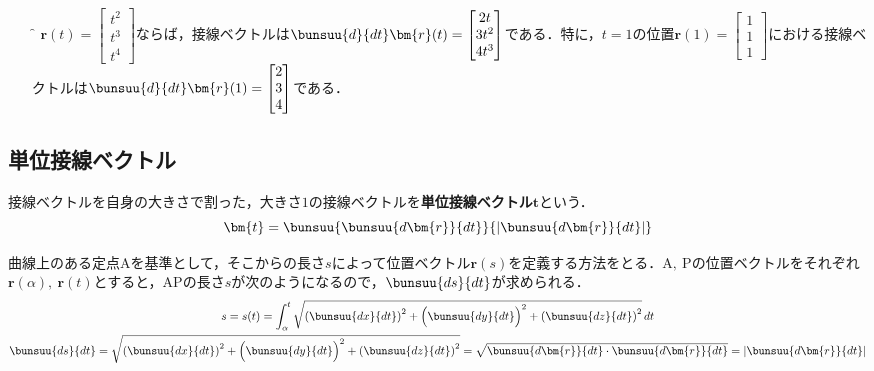 \begin{enumerate}[leftmargin=18pt, labelsep=10pt, labelsep=10pt, itemindent=9pt]
	\item[\f{例}] $\bm{r}(t) =
		\begin{bmatrix}
			t^2\\ t^3\\ t^4
		\end{bmatrix}
		$ならば，接線ベクトルは$\bunsuu{d}{dt}\bm{r}(t) =
		\begin{bmatrix}
			2t\\ 3t^2\\ 4t^3
		\end{bmatrix}
		$である．特に，$t = 1$の位置$\bm{r}(1) =
		\begin{bmatrix}
			1\\ 1\\ 1
		\end{bmatrix}
		$における接線ベクトルは$\bunsuu{d}{dt}\bm{r}(1) =
		\begin{bmatrix}
			2\\ 3\\ 4
		\end{bmatrix}
		$である．
\end{enumerate}



\subsection{単位接線ベクトル}

接線ベクトルを自身の大きさで割った，大きさ$1$の接線ベクトルを\textbf{単位接線ベクトル}$\bm{t}$という．
\begin{equation}
	\bm{t} = \bunsuu{\bunsuu{d\bm{r}}{dt}}{\left|\bunsuu{d\bm{r}}{dt}\right|} \label{equ:VK-1}
\end{equation}

曲線上のある定点$\mathrm{A}$を基準として，そこからの長さ$s$によって位置ベクトル$\bm{r}(s)$を定義する方法をとる．$\mathrm{A,\ P}$の位置ベクトルをそれぞれ$\bm{r}(\alpha),\ \bm{r}(t)$とすると，$\mathrm{AP}$の長さ$s$が次のようになるので，$\bunsuu{ds}{dt}$が求められる．
\begin{gather}
	s = s(t) = \int_{\alpha}^{t} \sqrt{\left(\bunsuu{dx}{dt}\right)^2 + \Bigl(\bunsuu{dy}{dt}\Bigr)^2 + \left(\bunsuu{dz}{dt}\right)^2}\,dt\\
	\bunsuu{ds}{dt} = \sqrt{\left(\bunsuu{dx}{dt}\right)^2 + \Bigl(\bunsuu{dy}{dt}\Bigr)^2 + \left(\bunsuu{dz}{dt}\right)^2} = \sqrt{\bunsuu{d\bm{r}}{dt} \cdot \bunsuu{d\bm{r}}{dt}} = \left|\bunsuu{d\bm{r}}{dt}\right|
\end{gather}

